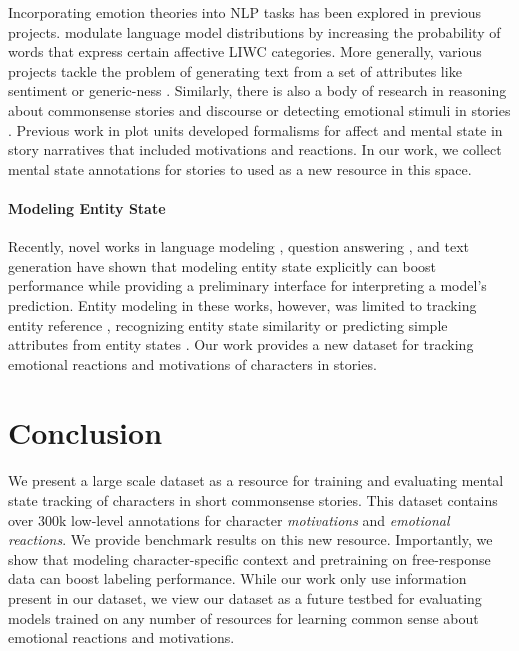 \documentclass[11pt,a4paper]{article}
\begin{document}
Incorporating emotion theories into NLP tasks has been explored in previous projects.
\citet{Ghosh2017-lj} modulate language model distributions by increasing the probability of words that express certain affective LIWC \cite{Tausczik2016-rd} categories.  More generally, various projects tackle the problem of generating text from a set of attributes like sentiment or generic-ness \cite{Ficler2017-ab,Dong2017-vr}.  Similarly, there is also a body of research in reasoning about commonsense stories and discourse \cite{Li2017-vw, Mostafazadeh2016-ei} or detecting emotional stimuli in stories \cite{Gui2017-op}.  Previous work in plot units \cite{Lehnert1981PlotUnits} developed formalisms for affect and mental state in story narratives that included motivations and reactions.
In our work, we collect mental state annotations for stories to used as a new resource in this space.

\vspace{-1mm}
\paragraph{Modeling Entity State}

Recently, novel works in language modeling \cite{Ji2017,reflm}, question answering \cite{ren}, and text generation \cite{Kiddon2016-ez,Bosselut17} have shown that modeling entity state explicitly can boost performance while providing a preliminary interface for interpreting a model's prediction. Entity modeling in these works, however, was limited to tracking entity reference \cite{Kiddon2016-ez,reflm,Ji2017}, recognizing entity state similarity \cite{ren} or predicting simple attributes from entity states \cite{Bosselut17}. Our work provides a new dataset for tracking emotional reactions and motivations of characters in stories.

 \section{Conclusion}
We present a large scale dataset as a resource for training and evaluating mental state tracking of characters in short commonsense stories.  This dataset contains over 300k low-level annotations for character {\it motivations} and {\it emotional reactions}.  
We provide benchmark results on this new resource. Importantly, we show that modeling character-specific context and pretraining on free-response data can boost labeling performance.  While our work only use information present in our dataset, we view our dataset as a future testbed for evaluating models trained on any number of resources for learning common sense about emotional reactions and motivations.
\end{document}
